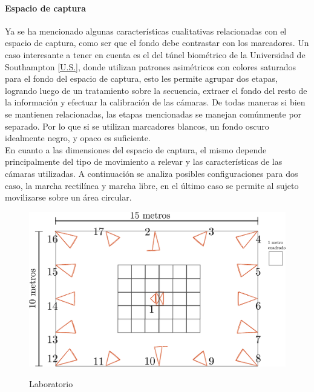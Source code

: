 \paragraph{Espacio de captura}

Ya se ha mencionado algunas características cualitativas relacionadas con el espacio de captura, como ser que el fondo debe contrastar con los marcadores. Un caso interesante a tener en cuenta es el del túnel biométrico de la Universidad de Southampton \ref{U.S.}, donde  utilizan patrones asimétricos con colores saturados para el fondo del espacio de captura, esto les permite agrupar dos etapas, logrando luego de un tratamiento sobre la secuencia, extraer el fondo del resto de la información y efectuar la calibración de las cámaras. De todas maneras si bien se mantienen relacionadas, las etapas mencionadas se manejan comúnmente por separado. Por lo que si se utilizan marcadores blancos, un fondo oscuro idealmente negro, y opaco es suficiente.\\

En cuanto a las dimensiones del espacio de captura, el mismo depende principalmente del tipo de movimiento a relevar y las características de las cámaras utilizadas. A continuación se analiza posibles configuraciones para dos caso, la marcha rectilínea y marcha libre, en el último caso se permite al sujeto movilizarse sobre un área circular.


\begin{figure}[H]
  \centering
  {\includegraphics[scale=0.2]{img/Base_Datos/Laboratorio.eps}\label{img_Laboratorio}}      
  \caption{Laboratorio}
  \label{estimacion_resolucion}
\end{figure}  
 
